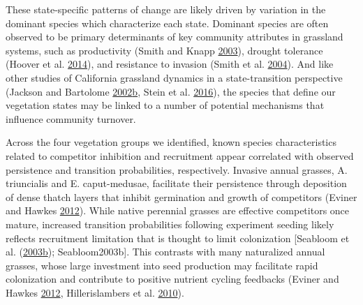 \documentclass[twoside,12pt,final]{ucthesis-CA2012}
\begin{document}
\begin{ucmainmatter}
These state-specific patterns of change are likely driven by variation in the dominant species which characterize each state.
Dominant species are often observed to be primary determinants of key community attributes in grassland systems, such as productivity (Smith and Knapp \protect\hyperlink{ref-Smith2003}{2003}), drought tolerance (Hoover et al. \protect\hyperlink{ref-Hoover2014}{2014}), and resistance to invasion (Smith et al. \protect\hyperlink{ref-Smith2004}{2004}).
And like other studies of California grassland dynamics in a state-transition perspective (Jackson and Bartolome \protect\hyperlink{ref-Jackson2002}{2002}\protect\hyperlink{ref-Jackson2002}{b}, Stein et al. \protect\hyperlink{ref-Stein2016}{2016}), the species that define our vegetation states may be linked to a number of potential mechanisms that influence community turnover.

Across the four vegetation groups we identified, known species characteristics related to competitor inhibition and recruitment appear correlated with observed persistence and transition probabilities, respectively.
Invasive annual grasses, A. triuncialis and E. caput-medusae, facilitate their persistence through deposition of dense thatch layers that inhibit germination and growth of competitors (Eviner and Hawkes \protect\hyperlink{ref-Eviner2012}{2012}).
While native perennial grasses are effective competitors once mature, increased transition probabilities following experiment seeding likely reflects recruitment limitation that is thought to limit colonization {[}Seabloom et al. (\protect\hyperlink{ref-Seabloom2003a}{2003}\protect\hyperlink{ref-Seabloom2003a}{b}); Seabloom2003b{]}.
This contrasts with many naturalized annual grasses, whose large investment into seed production may facilitate rapid colonization and contribute to positive nutrient cycling feedbacks (Eviner and Hawkes \protect\hyperlink{ref-Eviner2012}{2012}, Hillerislambers et al. \protect\hyperlink{ref-Hillerislambers2010}{2010}).


\end{ucmainmatter}
\end{document}
